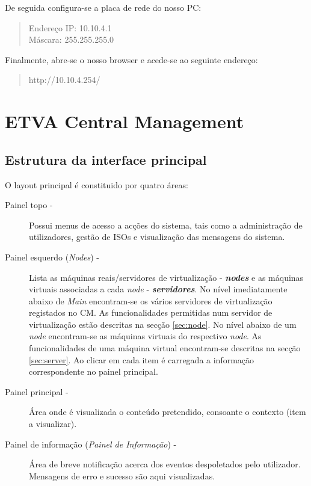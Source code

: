 De seguida configura-se a placa de rede do nosso PC:

\begin{quote}
Endereço IP: 10.10.4.1\\
Máscara: 255.255.255.0
\end{quote}

Finalmente, abre-se o nosso browser e acede-se ao seguinte endereço:
\begin{quote}
http://10.10.4.254/
\end{quote}

\pagebreak
\chapter{\textsf{ETVA Central Management}}

\section{Estrutura da interface principal}
O layout principal é constituido por quatro áreas:

\begin{description}
	\item[Painel topo -] Possui menus de acesso a acções do sistema, tais como a administração de utilizadores, gestão de ISOs e visualização das mensagens do sistema.
	\item[Painel esquerdo (\emph{Nodes}) -] Lista as máquinas reais/servidores de virtualização - {\bf\emph{nodes}} e as máquinas virtuais associadas a cada \emph{node} - {\bf\emph{servidores}}. No nível imediatamente abaixo de \emph{Main} encontram-se os vários servidores de virtualização registados no CM. As funcionalidades permitidas num servidor de virtualização estão descritas na secção \ref{sec:node}. No nível abaixo de um \emph{node} encontram-se as máquinas virtuais do respectivo \emph{node}. As funcionalidades de uma máquina virtual encontram-se descritas na secção \ref{sec:server}. Ao clicar em cada item é carregada a informação correspondente no painel principal.
	\item[Painel principal -] Área onde é visualizada o conteúdo pretendido, consoante o contexto (item a visualizar).
	\item[Painel de informação (\emph{Painel de Informação}) -] Área de breve notificação acerca dos eventos despoletados pelo utilizador. Mensagens de erro e sucesso são aqui visualizadas.
\end{description}

